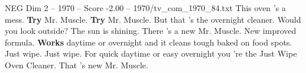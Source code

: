 \begin{textsample}{NEG Dim 2 – 1970 – Score -2.00 – 1970/tv\_com\_1970\_84.txt}  \label{ex:f2_neg_044}
This oven 's a mess. \textbf{Try} Mr.
Muscle. \textbf{Try} Mr.
Muscle.
But that 's the overnight cleaner.
Would you look outside?
The sun is shining.
There 's a new Mr.
Muscle.
New improved formula. \textbf{Works} daytime or overnight and it cleans tough baked on food spots.
Just wipe.
Just wipe.
For quick daytime or easy overnight you 're the Just Wipe Oven Cleaner.
That 's new Mr.
Muscle.

\end{textsample}
